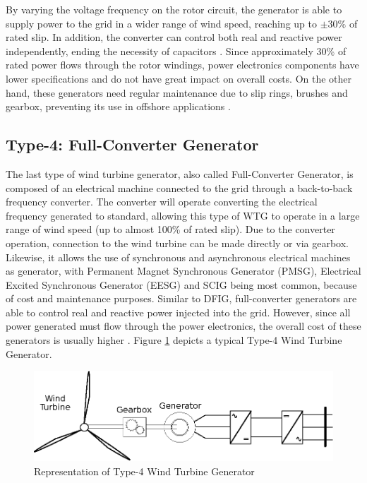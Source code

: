 By varying the voltage frequency on the rotor circuit, the generator is able to supply power to the grid in a wider range of wind speed, reaching up to $\pm 30\%$ of rated slip. In addition, the converter can control both real and reactive power independently, ending the necessity of capacitors \cite{Muljadi2010}. Since approximately 30\% of rated power flows through the rotor windings, power electronics components have lower specifications and do not have great impact on overall costs. On the other hand, these generators need regular maintenance due to slip rings, brushes and gearbox, preventing its use in offshore applications \cite{Yaramasu2015}.

\subsection{Type-4: Full-Converter Generator}

The last type of wind turbine generator, also called Full-Converter Generator, is composed of an electrical machine connected to the grid through a back-to-back frequency converter. The converter will operate converting the electrical frequency generated to standard, allowing this type of WTG to operate in a large range of wind speed (up to almost 100\% of rated slip). Due to the converter operation, connection to the wind turbine can be made directly or via gearbox. Likewise, it allows the use of synchronous and asynchronous electrical machines as generator, with Permanent Magnet Synchronous Generator (PMSG), Electrical Excited Synchronous Generator (EESG) and SCIG being most common, because of cost and maintenance purposes. Similar to DFIG, full-converter generators are able to control real and reactive power injected into the grid. However, since all power generated must flow through the power electronics, the overall cost of these generators is usually higher \cite{Yaramasu2015}. Figure \ref{fig: WTG4} depicts a typical Type-4 Wind Turbine Generator.

\begin{figure}[h]
	\caption{Representation of Type-4 Wind Turbine Generator}
	\begin{center}
		\includegraphics[scale=.8]{Images/Type4WTG.eps}
	\end{center}
	\label{fig: WTG4}
\end{figure}

